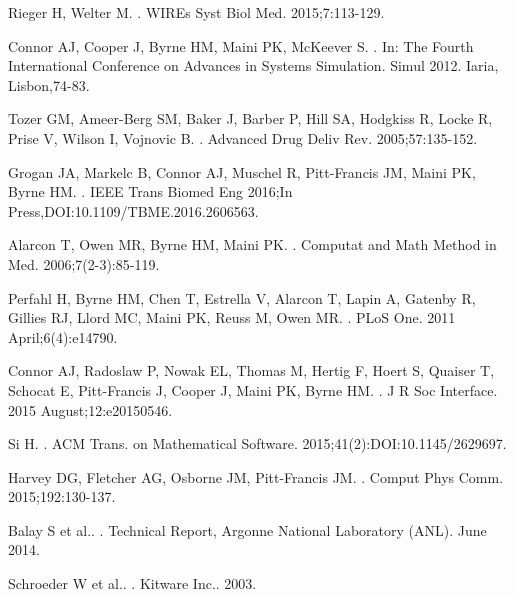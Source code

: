 \documentclass[10pt,letterpaper]{article}
\begin{document}
\begin{thebibliography}{10}
Rieger H, Welter M.
.
\newblock WIREs Syst Biol Med. 2015;7:113-129.

Connor AJ, Cooper J, Byrne HM, Maini PK, McKeever S.
.
\newblock In: The Fourth International Conference on Advances in Systems Simulation. Simul 2012. Iaria, Lisbon,74-83.

Tozer GM, Ameer-Berg SM, Baker J, Barber P, Hill SA, Hodgkiss R, Locke R, Prise V, Wilson I, Vojnovic B.
.
\newblock Advanced Drug Deliv Rev. 2005;57:135-152.

Grogan JA, Markelc B, Connor AJ, Muschel R, Pitt-Francis JM, Maini PK, Byrne HM.
.
\newblock IEEE Trans Biomed Eng 2016;In Press,DOI:10.1109/TBME.2016.2606563.

Alarcon T, Owen MR, Byrne HM, Maini PK.
.
\newblock Computat and Math Method in Med. 2006;7(2-3):85-119.

Perfahl H, Byrne HM, Chen T, Estrella V, Alarcon T, Lapin A, Gatenby R, Gillies RJ, Llord MC, Maini PK, Reuss M, Owen MR.
.
\newblock PLoS One. 2011 April;6(4):e14790.

Connor AJ, Radoslaw P, Nowak EL, Thomas M, Hertig F, Hoert S, Quaiser T, Schocat E, Pitt-Francis J, Cooper J, Maini PK, Byrne HM.
.
\newblock J R Soc Interface. 2015 August;12:e20150546.

Si H.
.
\newblock ACM Trans. on Mathematical Software. 2015;41(2):DOI:10.1145/2629697.

Harvey DG, Fletcher AG, Osborne JM, Pitt-Francis JM.
.
\newblock Comput Phys Comm. 2015;192:130-137.

Balay S et al..
.
\newblock Technical Report, Argonne National Laboratory (ANL). June 2014.

Schroeder W et al..
.
\newblock  Kitware Inc.. 2003.

\end{thebibliography}
\end{document}
